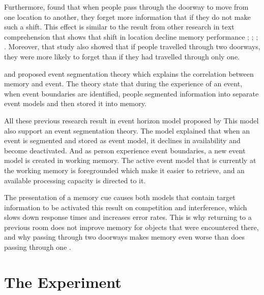 
Furthermore, \cite{Radvansky2010} found that when people pass through the doorway to move from
one location to another, they forget more information that if they do not make such a shift. This
effect is similar to the result from other research in text comprehension that shows that shift
in location decline memory performance \citep{Curiel2002}; \citep{Haenggi1995}; \citep{Radvansky2010}; \citep{Radvansky2003}.
Moreover, that study also showed that if people travelled through two doorways, they were more
likely to forget than if they had travelled through only one.

\cite{Kurby2008} and \cite{Swallow2009} proposed event segmentation theory
which explains the correlation between memory and event.
 The theory state that during the experience of an event,
 when event boundaries are identified, people segmented information into separate event models and then stored it into memory.

All these previous research result in event horizon model proposed by \cite{Radvansky2012}
This model also support an event segmentation theory. The model explained that when an event is
segmented and stored as event model, it declines in availability and become deactivated. And
as person experience event boundaries, a new event model is created in working memory. The
active event model that is currently at the working memory is foregrounded which make it easier
to retrieve, and an available processing capacity is directed to it.

The presentation of a memory cue causes both models that contain target information to
be activated this result on competition and interference, which slows down response times and
increases error rates. This is why returning to a previous room does not improve memory for
objects that were encountered there, and why passing through two doorways makes memory even
worse than does passing through one \citep{Radvansky2011}.


\section{The Experiment}

